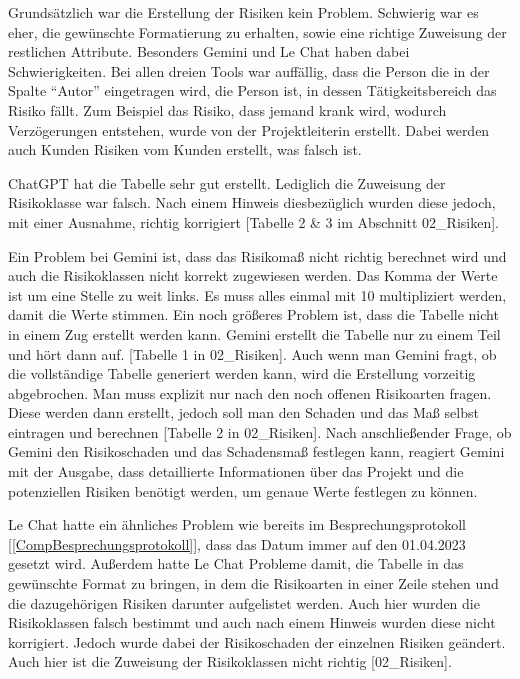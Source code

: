 Grundsätzlich war die Erstellung der Risiken kein Problem. Schwierig war es eher, die gewünschte Formatierung zu erhalten, 
sowie eine richtige Zuweisung der restlichen Attribute. Besonders Gemini und Le Chat haben dabei Schwierigkeiten.
Bei allen dreien Tools war auffällig, dass die Person die in der Spalte ``Autor'' eingetragen wird, die Person ist, in dessen
Tätigkeitsbereich das Risiko fällt. Zum Beispiel das Risiko, dass jemand krank wird, wodurch Verzögerungen entstehen, wurde von 
der Projektleiterin erstellt. Dabei werden auch Kunden Risiken vom Kunden erstellt, was falsch ist.

ChatGPT hat die Tabelle sehr gut erstellt. Lediglich die Zuweisung der Risikoklasse war falsch. Nach einem Hinweis 
diesbezüglich wurden diese jedoch, mit einer Ausnahme, richtig korrigiert [Tabelle 2 \& 3 im Abschnitt 02\_Risiken].

Ein Problem bei Gemini ist, dass das Risikomaß nicht richtig berechnet wird und auch die Risikoklassen nicht korrekt 
zugewiesen werden. Das Komma der Werte ist um eine Stelle zu weit links. Es muss alles einmal mit 10 multipliziert werden, damit die 
Werte stimmen. Ein noch größeres Problem ist, dass die Tabelle nicht in einem Zug erstellt werden kann. Gemini erstellt die Tabelle nur zu einem 
Teil und hört dann auf. [Tabelle 1 in 02\_Risiken]. Auch wenn man Gemini fragt, ob die vollständige Tabelle generiert werden kann, wird 
die Erstellung vorzeitig abgebrochen. Man muss explizit nur nach den noch offenen Risikoarten fragen. Diese werden dann erstellt, jedoch soll man 
den Schaden und das Maß selbst eintragen und berechnen [Tabelle 2 in 02\_Risiken]. Nach anschließender Frage, ob Gemini den Risikoschaden und das Schadensmaß 
festlegen kann, reagiert Gemini mit der Ausgabe, dass detaillierte Informationen über das Projekt und die potenziellen Risiken benötigt werden, 
um genaue Werte festlegen zu können.

Le Chat hatte ein ähnliches Problem wie bereits im Besprechungsprotokoll [\autoref{CompBesprechungsprotokoll}], dass das 
Datum immer auf den 01.04.2023 gesetzt wird. Außerdem hatte Le Chat Probleme damit, die Tabelle in das gewünschte Format
zu bringen, in dem die Risikoarten in einer Zeile stehen und die dazugehörigen Risiken darunter aufgelistet werden. Auch 
hier wurden die Risikoklassen falsch bestimmt und auch nach einem Hinweis wurden diese nicht korrigiert. Jedoch wurde 
dabei der Risikoschaden der einzelnen Risiken geändert. Auch hier ist die Zuweisung der Risikoklassen nicht richtig [02\_Risiken].

